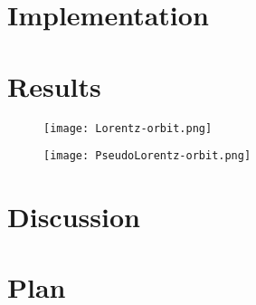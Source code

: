 \documentclass[]{article}
\begin{document}
\section{Implementation}

\section{Results}
\begin{figure}[H]
	\texttt{[image: Lorentz-orbit.png]}
\end{figure}

\begin{figure}[H]
	\texttt{[image: PseudoLorentz-orbit.png]}
\end{figure}
\section{Discussion}

\section{Plan}
\end{document}
